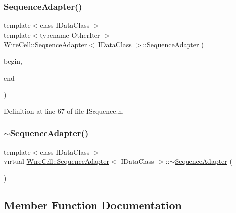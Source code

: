 \subsubsection{\texorpdfstring{Sequence\+Adapter()}{SequenceAdapter()}}
{\footnotesize\ttfamily template$<$class I\+Data\+Class $>$ \\
template$<$typename Other\+Iter $>$ \\
\hyperlink{class_wire_cell_1_1_sequence_adapter}{Wire\+Cell\+::\+Sequence\+Adapter}$<$ I\+Data\+Class $>$\+::\hyperlink{class_wire_cell_1_1_sequence_adapter}{Sequence\+Adapter} (\begin{DoxyParamCaption}\item[{const Other\+Iter \&}]{begin,  }\item[{const Other\+Iter \&}]{end }\end{DoxyParamCaption})\hspace{0.3cm}{\ttfamily [inline]}}



Definition at line 67 of file I\+Sequence.\+h.

\mbox{\label{class_wire_cell_1_1_sequence_adapter_a1ea7425070e3087980a1578d74c7e46d}} 
\subsubsection{\texorpdfstring{$\sim$\+Sequence\+Adapter()}{~SequenceAdapter()}}
{\footnotesize\ttfamily template$<$class I\+Data\+Class $>$ \\
virtual \hyperlink{class_wire_cell_1_1_sequence_adapter}{Wire\+Cell\+::\+Sequence\+Adapter}$<$ I\+Data\+Class $>$\+::$\sim$\hyperlink{class_wire_cell_1_1_sequence_adapter}{Sequence\+Adapter} (\begin{DoxyParamCaption}{ }\end{DoxyParamCaption})\hspace{0.3cm}{\ttfamily [virtual]}}



\subsection{Member Function Documentation}
\mbox{\label{class_wire_cell_1_1_sequence_adapter_ab9d7082a27f17937871ef9ff97e1b8ad}} 
